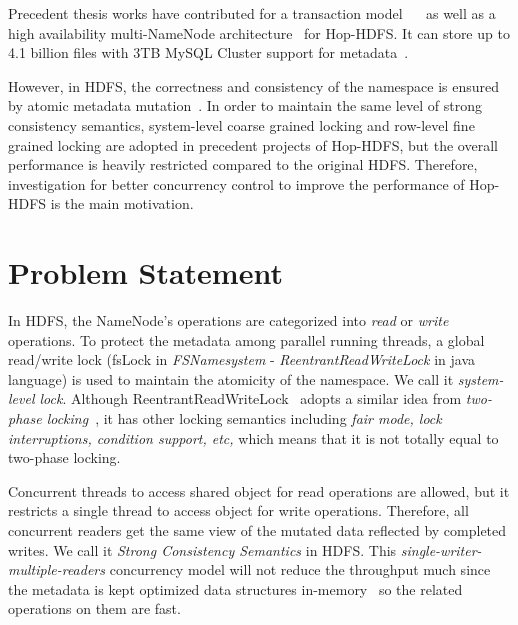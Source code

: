 \noindent Precedent thesis works have contributed for a transaction model~\cite{wasif2012distributed} ~\cite{peiro2013maintaining} as well as a high availability multi-NameNode architecture~\cite{d2013kthfs} for Hop-HDFS. It can store up to 4.1 billion files with 3TB MySQL Cluster support for metadata~\cite{hakimzadeh2014scaling}. 

\noindent However, in HDFS, the correctness and consistency of the namespace is ensured by atomic metadata mutation~\cite{shvachko2010hadoop}. In order to maintain the same level of strong consistency semantics, system-level coarse grained locking and row-level fine grained locking are adopted in precedent projects of Hop-HDFS, but the overall performance is heavily restricted compared to the original HDFS. Therefore, investigation for better concurrency control to improve the performance of Hop-HDFS is the main motivation.

\section{Problem Statement}

In HDFS, the NameNode's operations are categorized into \textit{read} or \textit{write} operations. To protect the metadata among parallel running threads, a global read/write lock (fsLock in \textit{FSNamesystem} - \textit{ReentrantReadWriteLock} in java language) is used to maintain the atomicity of the namespace. We call it \textit{system-level lock}. Although ReentrantReadWriteLock~\cite{reentrantReadWriteLock} adopts a similar idea from \textit{two-phase locking}~\cite{berenson1995critique}, it has other locking semantics including \textit{fair mode, lock interruptions, condition support, etc,} which means that it is not totally equal to two-phase locking.

\noindent Concurrent threads to access shared object for read operations are allowed, but it restricts a single thread to access object for write operations. Therefore, all concurrent readers get the same view of the mutated data reflected by completed writes. We call it \textit{Strong Consistency Semantics} in HDFS. This \textit{single-writer-multiple-readers} concurrency model will not reduce the throughput much since the metadata is kept optimized data structures in-memory~\cite{hakimzadeh2014scaling} so the related operations on them are fast.

